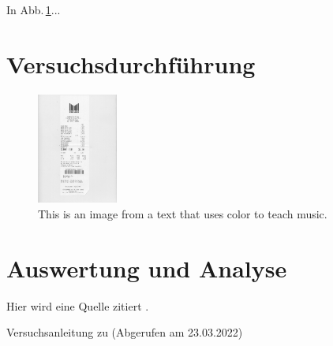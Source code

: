 \documentclass[a4paper,12pt,bibtotocnumbered]{scrartcl}
\numberwithin{equation}{section} %
\begin{document}

In Abb.\,\ref{fig}...%



\section[Versuchsdurchführung]{Versuchsdurchführung}

\begin{figure}[htbp]
\centerline{\includegraphics[width=100px]{images/001.jpg}}
\caption{This is an image from a text that uses color to teach music.}
\label{fig}
\end{figure}

\section[Auswertung und Analyse]{Auswertung und Analyse}

\lipsum[2]

Hier wird eine Quelle zitiert \cite{Quelle}.

\begin{thebibliography}{999}
 Versuchsanleitung zu (Abgerufen am 23.03.2022) 
\end{thebibliography}


%
\end{document}

